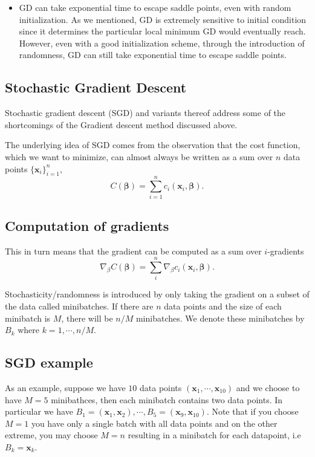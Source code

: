 \documentclass[%
oneside,                 %
final,                   %
10pt]{article}
\begin{document}
\begin{itemize}
\item GD can take exponential time to escape saddle points, even with random initialization. As we mentioned, GD is extremely sensitive to initial condition since it determines the particular local minimum GD would eventually reach. However, even with a good initialization scheme, through the introduction of randomness, GD can still take exponential time to escape saddle points.
\end{itemize}

\noindent
\subsection*{Stochastic Gradient Descent}

Stochastic gradient descent (SGD) and variants thereof address some of
the shortcomings of the Gradient descent method discussed above.

The underlying idea of SGD comes from the observation that the cost
function, which we want to minimize, can almost always be written as a
sum over $n$ data points $\{\mathbf{x}_i\}_{i=1}^n$,
\[
C(\mathbf{\beta}) = \sum_{i=1}^n c_i(\mathbf{x}_i,
\mathbf{\beta}). 
\]

\subsection*{Computation of gradients}

This in turn means that the gradient can be
computed as a sum over $i$-gradients 
\[
\nabla_\beta C(\mathbf{\beta}) = \sum_i^n \nabla_\beta c_i(\mathbf{x}_i,
\mathbf{\beta}).
\]

Stochasticity/randomness is introduced by only taking the
gradient on a subset of the data called minibatches.  If there are $n$
data points and the size of each minibatch is $M$, there will be $n/M$
minibatches. We denote these minibatches by $B_k$ where
$k=1,\cdots,n/M$.

\subsection*{SGD example}
As an example, suppose we have $10$ data points $(\mathbf{x}_1,\cdots, \mathbf{x}_{10})$ 
and we choose to have $M=5$ minibathces,
then each minibatch contains two data points. In particular we have
$B_1 = (\mathbf{x}_1,\mathbf{x}_2), \cdots, B_5 =
(\mathbf{x}_9,\mathbf{x}_{10})$. Note that if you choose $M=1$ you
have only a single batch with all data points and on the other extreme,
you may choose $M=n$ resulting in a minibatch for each datapoint, i.e
$B_k = \mathbf{x}_k$.
\end{document}
